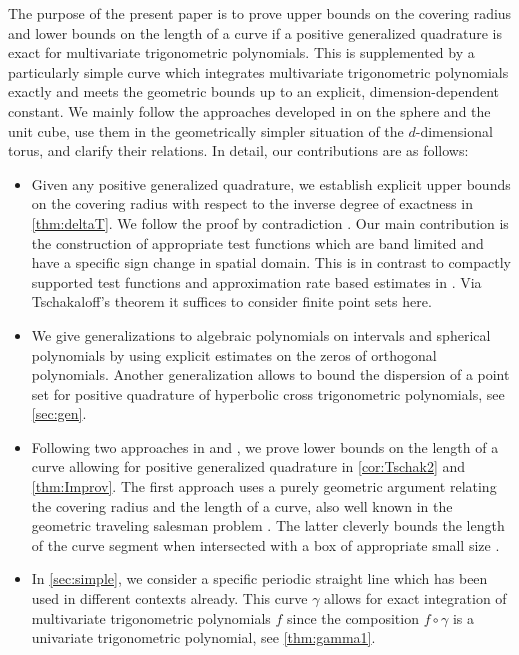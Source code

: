 \documentclass[11pt,a4paper,twoside,final,biblatex]{scrartcl}
\theoremstyle{definition}
\numberwithin{equation}{section}
\numberwithin{table}{section}
\numberwithin{figure}{section}
\begin{document}
The purpose of the present paper is to prove upper bounds on the covering radius and lower bounds on the length of a curve if a positive generalized quadrature is exact for multivariate trigonometric polynomials. This is supplemented by a particularly simple curve which integrates multivariate trigonometric polynomials exactly and meets the geometric bounds up to an explicit, dimension-dependent constant. We mainly follow the approaches developed in \cite{Re03,BoDeVi17,EhGr23,EhGrKa25,EhGr26} on the sphere and the unit cube, use them in the geometrically simpler situation of the $d$-dimensional torus, and clarify their relations. In detail, our contributions are as follows:
\begin{itemize}
    \item Given any positive generalized quadrature, we establish explicit upper bounds on the covering radius with respect to the inverse degree of exactness in \cref{thm:deltaT}.
    We follow the proof by contradiction \cite[Chapter 6]{Re03}. Our main contribution is the construction of appropriate test functions which are band limited and have a specific sign change in spatial domain. This is in contrast to compactly supported test functions and approximation rate based estimates in \cite{EhGr23,EhGrKa25}. Via Tschakaloff's theorem it suffices to consider finite point sets here. 
    \item We give generalizations to algebraic polynomials on intervals and spherical polynomials by using explicit estimates on the zeros of orthogonal polynomials. Another generalization allows to bound the dispersion of a point set for positive quadrature of hyperbolic cross trigonometric polynomials, see \cref{sec:gen}.
    \item Following two approaches in \cite{EhGr23,EhGrKa25} and \cite{EhGr26}, we prove lower bounds on the length of a curve allowing for positive generalized quadrature in \cref{cor:Tschak2} and \cref{thm:Improv}. The first approach uses a purely geometric argument relating the covering radius and the length of a curve, also well known in the geometric traveling salesman problem \cite{BaClDu24}. The latter cleverly bounds the length of the curve segment when intersected with a box of appropriate small size \cite{EhGr26}.
    \item In \cref{sec:simple}, we consider a specific periodic straight line which has been used in different contexts already. This curve $\gamma$ allows for exact integration of multivariate trigonometric polynomials $f$ since the composition $f\circ\gamma$ is a univariate trigonometric polynomial, see \cref{thm:gamma1}.

\end{itemize}
\end{document}
